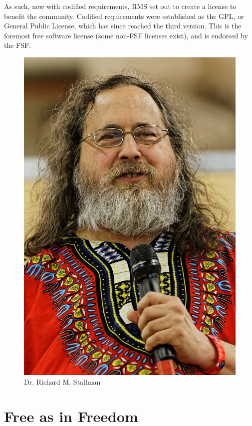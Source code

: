 \documentclass[12pt]{article}
\begin{document}
\begin{multicols}{3}
  As such, now with codified requirements, RMS set out to create a license to benefit the community. Codified requirements were established as the GPL, or General Public License, which has since reached the third version. This is the foremost free software license (some non-FSF licenses exist), and is endorsed by the FSF. 

  \begin{figure}
  \includegraphics[width=\linewidth]{Images/Stallman.jpeg}
  \caption{\tiny Dr. Richard M. Stallman}
  \end{figure}

\section*{\small Free as in Freedom}


\end{multicols}
\end{document}
